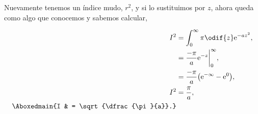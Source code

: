 \documentclass[../main.tex]{subfiles}
\begin{document}
\begin{problema}[10]
	Nuevamente tenemos un índice mudo, \(r^{2}\), y si lo sustituimos por
	\(z\), ahora queda como algo que conocemos y sabemos calcular,

	\begin{align*}
		I^{2}         & = \int_{0}^{\infty} \pi \odif{z} \mathrm{e}^{-a z^{2}},              \\
		              & = \dfrac{-\pi}{a} \biggl.\mathrm{e}^{-z}\biggr\rvert_{0}^{\infty},   \\
		              & = \dfrac{-\pi}{a} \bigl(\mathrm{e}^{-\infty} - \mathrm{e}^{0}\bigr), \\
		I^{2}         & = \dfrac{\pi}{a},                                                    \\
		\Aboxedmain{I & = \sqrt{\dfrac{\pi}{a}}.}
	\end{align*}
\end{problema}
\end{document}
